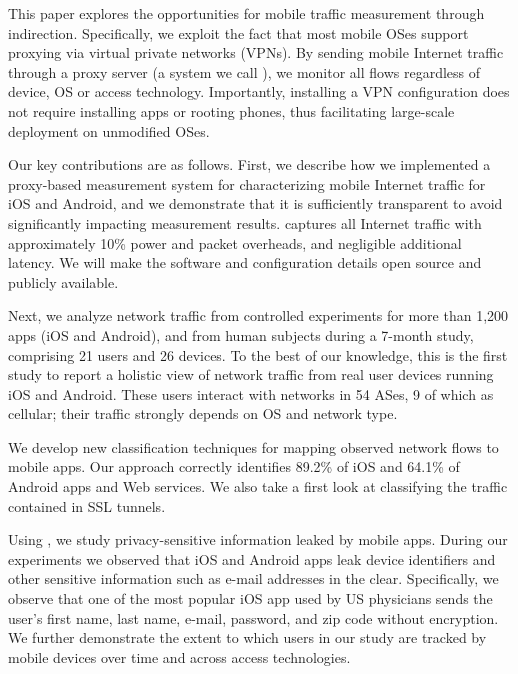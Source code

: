 This paper explores the opportunities for mobile traffic measurement through indirection. 
Specifically, we exploit the fact that most mobile OSes support proxying via virtual private networks (VPNs). 
By sending mobile Internet traffic through a proxy server (a system we call \platname), we monitor all flows regardless of device, OS or access technology. 
Importantly, installing a VPN configuration does not require installing apps or rooting phones, thus facilitating large-scale deployment on unmodified OSes.



Our key contributions are as follows. First, we describe how we implemented a proxy-based measurement system for characterizing mobile Internet traffic for iOS and Android, 
and we demonstrate that it is sufficiently transparent to avoid significantly impacting measurement results. 
\platname captures all Internet traffic with approximately 10\% power and packet overheads, and negligible additional latency. 
We will make the \platname software and configuration details open source and publicly available.

Next, we analyze network traffic from controlled experiments for more than 1,200 apps (iOS and Android), 
and from human subjects during a 7-month study, comprising 21 users and 26 devices. To the best of our knowledge, this is the first study to report a holistic 
view of network traffic from real user devices running iOS and Android. These users interact with networks in 54 ASes, 9 of which as cellular; their traffic 
strongly depends on OS and network type.

We develop new classification techniques for mapping observed network flows to mobile apps. Our approach correctly identifies 89.2\% of iOS and 64.1\% of Android apps and Web services. We also take a first look at classifying the traffic contained in SSL tunnels.

Using \platname, we study privacy-sensitive information leaked by mobile apps. During our experiments we observed that iOS and Android apps leak device identifiers and other sensitive information such as e-mail addresses in the clear. Specifically, we observe that one of the most popular iOS app used by US physicians sends the user's first name, last name, e-mail, password, and zip code without encryption. We further demonstrate the extent to which users in our study are tracked by mobile devices over time and across access technologies. 

